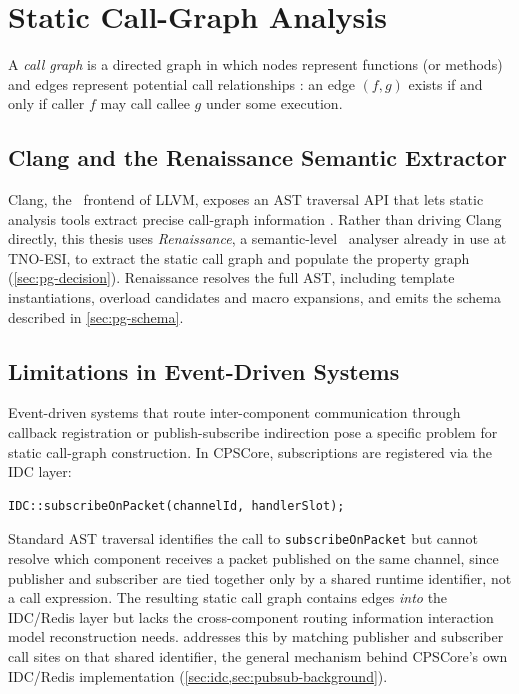 \section{Static Call-Graph Analysis}\label{sec:static-analysis}

A \emph{call graph} is a directed graph in which nodes represent
functions (or methods) and edges represent potential call relationships
\cite{grove:callgraph}: an edge $(f, g)$ exists if and only if caller $f$
may call callee $g$ under some execution.

\subsection{Clang and the Renaissance Semantic Extractor}

Clang, the \Cpp\ frontend of LLVM, exposes an \ac{AST} traversal \ac{API}
that lets static analysis tools extract precise call-graph information
\cite{llvm:clang}. Rather than driving Clang directly, this thesis uses
\emph{Renaissance}, a semantic-level \Cpp\ analyser already in use at
TNO-ESI, to extract the static call graph and populate the property
graph (\cref{sec:pg-decision}). Renaissance resolves the full \ac{AST},
including template instantiations, overload candidates and macro
expansions, and emits the schema described in \cref{sec:pg-schema}.

\subsection{Limitations in Event-Driven Systems}

Event-driven systems that route inter-component communication through
callback registration or publish-subscribe indirection pose a specific
problem for static call-graph construction. In CPSCore, subscriptions
are registered via the IDC layer:
\begin{verbatim}
IDC::subscribeOnPacket(channelId, handlerSlot);
\end{verbatim}
Standard \ac{AST} traversal identifies the call to
\texttt{subscribeOnPacket} but cannot resolve which component receives a
packet published on the same channel, since publisher and subscriber are
tied together only by a shared runtime identifier, not a call expression.
The resulting static call graph contains edges \emph{into} the IDC/Redis
layer but lacks the cross-component routing information interaction
model reconstruction needs.  addresses this
by matching publisher and subscriber call sites on that shared
identifier, the general mechanism behind CPSCore's own IDC/Redis
implementation (\cref{sec:idc,sec:pubsub-background}).

